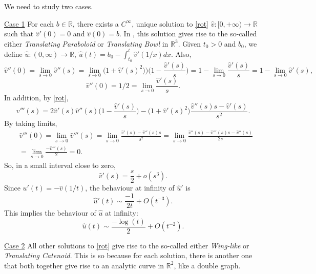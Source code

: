 \documentclass[12pt]{article}
\numberwithin{lemma}{section}
\newcommand{\R}{\mathbb{R}}
\begin{document}
{\color{black}
We need to study two cases. \par 
\noindent\underline{Case 1} For each $b\in\R$, there exists a $C^{\infty}$, unique solution to \eqref{rot}   $\hat{v}:[0,+\infty)\rightarrow\R$ such that $\hat{v}'(0)=0$ and $\hat{v}(0)=b$. In \cite{CSS}, this solution gives rise to the so-called either \textit{Translating Paraboloid} or \textit{Translating Bowl} in $\R^3$. Given $t_0>0$ and $b_0$, we define $\hat{u}:(0,\infty)\rightarrow\R$, $\hat{u}(t)=b_0-\int^t_{t_0}\hat{v}'(1/x)dx$. Also, 
\[ \hat{v}''(0)=\lim_{s\to 0}\hat{v}''(s) = 
\lim_{s\to 0}\big(1+\hat{v}'(s)^2)\big)\Big(1-\frac{\hat{v}'(s)}{s}\Big) 
= 1-  \lim_{s\to 0} \frac{\hat{v}'(s)}{s} = 1-\lim_{s\to 0} \hat{v}'(s),
\]
\[ \hat{v}''(0)=1/2=\lim_{s\to 0}\frac{\hat{v}'(s)}{s}.\]
In addition, by \eqref{rot}, 
\[ \hat{v}'''(s) = 2\hat{v}'(s)\hat{v}''(s)\Big(1-\frac{\hat{v}'(s)}{s}\Big) - \big(1+\hat{v}'(s)^2\big) \frac{\hat{v}''(s)s-\hat{v}'(s)}{s^2}.
\]
By taking limits, 
\begin{align*} & \hat{v}'''(0)=\lim_{s\to 0} \hat{v}'''(s) = \lim_{s\to 0} \frac{\hat{v}'(s)-\hat{v}''(s)s}{s^2} 
= \lim_{s\to 0} \frac{\hat{v}''(s)- \hat{v}'''(s)s-\hat{v}''(s)}{2s}
\\
& = \lim_{s\to 0} \frac{-\hat{v}'''(s)}{2} = 0.
\end{align*}
So, in a small interval close to zero, 
\[ \hat{v}'(s) = \frac{s}{2} + o(s^3).\]
Since $u'(t)=-\hat{v}(1/t)$, the behaviour at infinity of $\hat{u}'$ is
\[ \hat{u}'(t) \sim \frac{-1}{2t}+ O(t^{-3}).
\]
This implies the behaviour of $\hat{u}$ at infinity:
\[ \hat{u}(t) \sim \frac{-\log(t)}{2} + O(t^{-2}).
\]
\color{black} 
\par 
\noindent\underline{Case 2} All other solutions to \eqref{rot} give rise to the  so-called either \textit{Wing-like} or \textit{Translating Catenoid}. This is so because for each solution, there is another one that both together give rise to an analytic curve in $\R^2$, like a double graph. 


}
\end{document}

